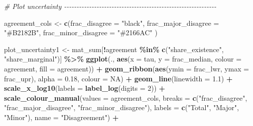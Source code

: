 \documentclass[
  11pt,
]{article}
\newenvironment{Shaded}{\begin{snugshade}}{\end{snugshade}}
\newcommand{\AttributeTok}[1]{\textcolor[rgb]{0.13,0.29,0.53}{#1}}
\newcommand{\CommentTok}[1]{\textcolor[rgb]{0.56,0.35,0.01}{\textit{#1}}}
\newcommand{\ConstantTok}[1]{\textcolor[rgb]{0.56,0.35,0.01}{#1}}
\newcommand{\DecValTok}[1]{\textcolor[rgb]{0.00,0.00,0.81}{#1}}
\newcommand{\FloatTok}[1]{\textcolor[rgb]{0.00,0.00,0.81}{#1}}
\newcommand{\FunctionTok}[1]{\textcolor[rgb]{0.13,0.29,0.53}{\textbf{#1}}}
\newcommand{\NormalTok}[1]{#1}
\newcommand{\OtherTok}[1]{\textcolor[rgb]{0.56,0.35,0.01}{#1}}
\newcommand{\SpecialCharTok}[1]{\textcolor[rgb]{0.81,0.36,0.00}{\textbf{#1}}}
\newcommand{\StringTok}[1]{\textcolor[rgb]{0.31,0.60,0.02}{#1}}
\begin{document}
\begin{Shaded}
\begin{Highlighting}[]
\CommentTok{\# Plot uncertainty {-}{-}{-}{-}{-}{-}{-}{-}{-}{-}{-}{-}{-}{-}{-}{-}{-}{-}{-}{-}{-}{-}{-}{-}{-}{-}{-}{-}{-}{-}{-}{-}{-}{-}{-}{-}{-}{-}{-}{-}{-}{-}{-}{-}{-}{-}{-}{-}{-}{-}{-}{-}{-}{-}{-}{-}{-}{-}{-}{-}{-}}

\NormalTok{agreement\_cols }\OtherTok{\textless{}{-}} \FunctionTok{c}\NormalTok{(}\AttributeTok{frac\_disagree =} \StringTok{"black"}\NormalTok{,}
                    \AttributeTok{frac\_major\_disagree =} \StringTok{"\#B2182B"}\NormalTok{,}
                    \AttributeTok{frac\_minor\_disagree =} \StringTok{"\#2166AC"}\NormalTok{  )}

\NormalTok{plot\_uncertainty1 }\OtherTok{\textless{}{-}}\NormalTok{ mat\_sum[}\SpecialCharTok{!}\NormalTok{agreement }\SpecialCharTok{\%in\%} \FunctionTok{c}\NormalTok{(}\StringTok{"share\_existence"}\NormalTok{, }\StringTok{"share\_marginal"}\NormalTok{)] }\SpecialCharTok{\%\textgreater{}\%}
  \FunctionTok{ggplot}\NormalTok{(.,}
  \FunctionTok{aes}\NormalTok{(}\AttributeTok{x =}\NormalTok{ tau, }\AttributeTok{y =}\NormalTok{ frac\_median, }\AttributeTok{colour =}\NormalTok{ agreement, }\AttributeTok{fill =}\NormalTok{ agreement)) }\SpecialCharTok{+}
  \FunctionTok{geom\_ribbon}\NormalTok{(}\FunctionTok{aes}\NormalTok{(}\AttributeTok{ymin =}\NormalTok{ frac\_lwr, }\AttributeTok{ymax =}\NormalTok{ frac\_upr), }\AttributeTok{alpha =} \FloatTok{0.18}\NormalTok{, }\AttributeTok{colour =} \ConstantTok{NA}\NormalTok{) }\SpecialCharTok{+}
  \FunctionTok{geom\_line}\NormalTok{(}\AttributeTok{linewidth =} \FloatTok{1.1}\NormalTok{) }\SpecialCharTok{+}
  \FunctionTok{scale\_x\_log10}\NormalTok{(}\AttributeTok{labels =} \FunctionTok{label\_log}\NormalTok{(}\AttributeTok{digits =} \DecValTok{2}\NormalTok{)) }\SpecialCharTok{+}
  \FunctionTok{scale\_colour\_manual}\NormalTok{(}\AttributeTok{values =}\NormalTok{ agreement\_cols,}
                      \AttributeTok{breaks =} \FunctionTok{c}\NormalTok{(}\StringTok{"frac\_disagree"}\NormalTok{,}
                                 \StringTok{"frac\_major\_disagree"}\NormalTok{,}
                                 \StringTok{"frac\_minor\_disagree"}\NormalTok{),}
                      \AttributeTok{labels =} \FunctionTok{c}\NormalTok{(}\StringTok{"Total"}\NormalTok{,}
                                 \StringTok{"Major"}\NormalTok{,}
                                 \StringTok{"Minor"}\NormalTok{),}
                      \AttributeTok{name =} \StringTok{"Disagreement"}\NormalTok{) }\SpecialCharTok{+}

\end{Highlighting}
\end{Shaded}
\end{document}
